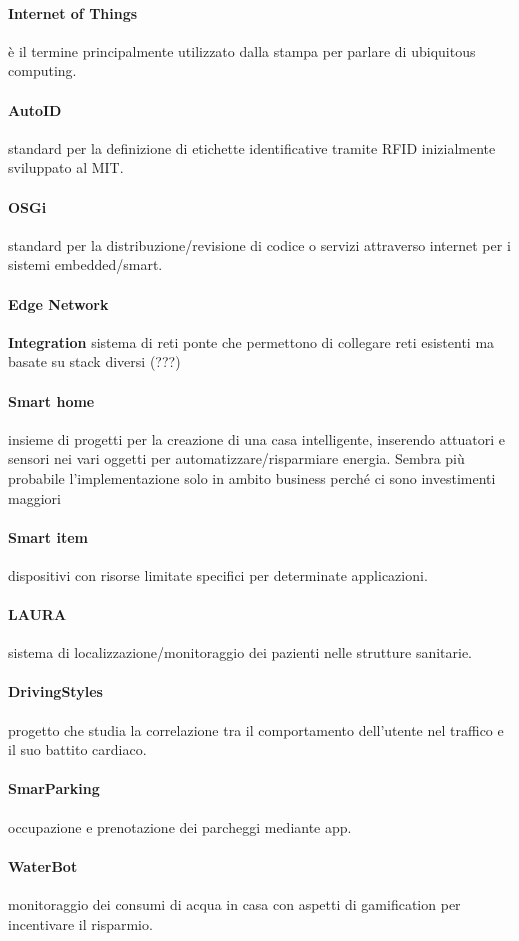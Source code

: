 \paragraph*{Internet of Things} è il termine principalmente utilizzato dalla
stampa per parlare di ubiquitous computing.

\paragraph*{AutoID} standard per la definizione di etichette identificative
tramite RFID inizialmente sviluppato al MIT.

\paragraph*{OSGi} standard per la distribuzione/revisione di codice o
servizi attraverso internet per i sistemi embedded/smart.

\paragraph*{Edge Network} \textbf{Integration} sistema di reti ponte che
permettono di collegare reti esistenti ma basate su stack diversi (???)

\paragraph*{Smart home} insieme di progetti per la creazione di una casa
intelligente, inserendo attuatori e sensori nei vari oggetti per
automatizzare/risparmiare energia. Sembra più probabile
l'implementazione solo in ambito business perché ci sono investimenti
maggiori

\paragraph*{Smart item} dispositivi con risorse limitate specifici per
determinate applicazioni.

\paragraph*{LAURA} sistema di localizzazione/monitoraggio dei pazienti nelle
strutture sanitarie.

\paragraph*{DrivingStyles} progetto che studia la correlazione tra il
comportamento dell'utente nel traffico e il suo battito cardiaco.

\paragraph*{SmarParking} occupazione e prenotazione dei parcheggi mediante
app.

\paragraph*{WaterBot} monitoraggio dei consumi di acqua in casa con aspetti
di gamification per incentivare il risparmio.

